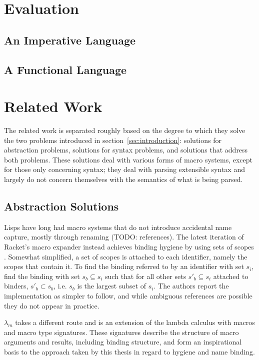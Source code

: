\documentclass{kththesis}
\begin{document}
\chapter{Evaluation}

\section{An Imperative Language} \label{sec:imperative-eval}

\section{A Functional Language} \label{sec:functional-eval}

\chapter{Related Work}

The related work is separated roughly based on the degree to which they solve the two problems introduced in section~\ref{sec:introduction}: solutions for abstraction problems, solutions for syntax problems, and solutions that address both problems. These solutions deal with various forms of macro systems, except for those only concerning syntax; they deal with parsing extensible syntax and largely do not concern themselves with the semantics of what is being parsed.

\section{Abstraction Solutions} \label{sec:abstraction-solutions}

Lisps have long had macro systems that do not introduce accidental name capture, mostly through renaming (TODO: references). The latest iteration of Racket's \cite{plt-tr1} macro expander instead achieves binding hygiene by using sets of scopes \cite{Flatt:2016:BSS:2837614.2837620}. Somewhat simplified, a set of scopes is attached to each identifier, namely the scopes that contain it. To find the binding referred to by an identifier with set $s_i$, find the binding with set $s_b \subseteq s_i$ such that for all other sets $s'_b \subseteq s_i$ attached to binders, $s'_b \subset s_b$, i.e. $s_b$ is the largest subset of $s_i$. The authors report the implementation as simpler to follow, and while ambiguous references are possible they do not appear in practice.

$\lambda_m$ \cite{Herman2010} takes a different route and is an extension of the lambda calculus with macros and macro type signatures. These signatures describe the structure of macro arguments and results, including binding structure, and form an inspirational basis to the approach taken by this thesis in regard to hygiene and name binding.
\end{document}

